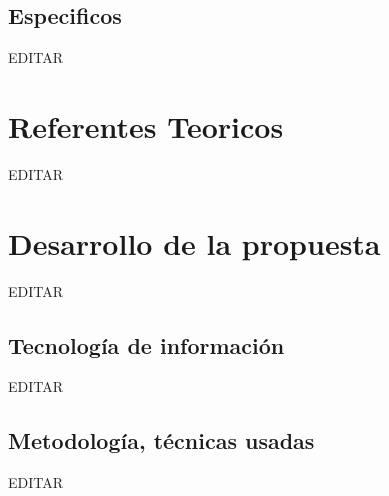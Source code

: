 \documentclass[preprint,12pt]{elsarticle}
\begin{document}

\subsection{\textbf{Especificos}}

EDITAR\\

 


\section{Referentes Teoricos}

EDITAR\\




\section{Desarrollo de la propuesta}

EDITAR\\


\subsection{\textbf{Tecnología de información}}

EDITAR\\


\subsection{\textbf{Metodología, técnicas usadas}}

EDITAR\\

\end{document}
